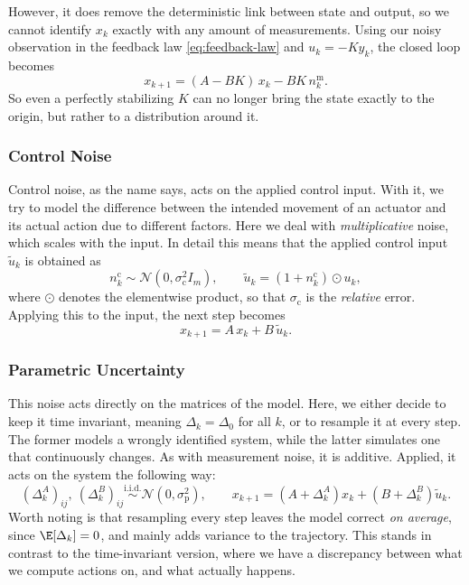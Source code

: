 However, it does remove the deterministic link between state and
output, so we cannot identify $x_k$ exactly with any amount of measurements. Using
our noisy observation in the feedback law \eqref{eq:feedback-law} and $u_k = -K y_k$, 
the closed loop becomes
\begin{equation}
    \label{eq:measurement-closed-loop}
    x_{k+1} = (A - BK)\, x_k - BK\, n^{\mathrm{m}}_k .
\end{equation}
So even a perfectly stabilizing $K$ can no longer bring the state exactly to the origin, 
but rather to a distribution around it.

\subsubsection{Control Noise}
\label{subsubsec:control-noise}

Control noise, as the name says, acts on the applied control input. With it,
we try to model the difference between the intended movement of an actuator
and its actual action due to different factors. Here we deal with
\emph{multiplicative} noise, which scales with the input. In
detail this means that the applied control input $\tilde{u}_k$ is obtained as
\begin{equation}
    \label{eq:control-noise}
    n^{\mathrm{c}}_k \sim \mathcal{N}\!\left(0, \sigma_{\mathrm{c}}^{2} I_m\right),
    \qquad
    \tilde{u}_k = \left( 1 + n^{\mathrm{c}}_k \right) \odot u_k ,
\end{equation}
where $\odot$ denotes the elementwise product, so that $\sigma_{\mathrm{c}}$ is
the \emph{relative} error. Applying this to the input, the next step becomes
\begin{equation}
    \label{eq:control-noise-step}
    x_{k+1} = A\, x_k + B\, \tilde{u}_k .
\end{equation}
\subsubsection{Parametric Uncertainty}
\label{subsubsec:parametric-uncertainty}

This noise acts directly on the matrices of the model. Here, we either decide to keep
it time invariant, meaning $\Delta_k = \Delta_0$ for all $k$, or to resample it
at every step. The former models a wrongly identified system, while the latter
simulates one that continuously changes. As with measurement noise, it is additive. 
Applied, it acts on the system the
following way:
\begin{equation}
    \label{eq:parametric-noise}
    \left( \Delta_k^{A} \right)_{ij},\ \left( \Delta_k^{B} \right)_{ij}
    \overset{\text{i.i.d.}}{\sim} \mathcal{N}\!\left(0, \sigma_{\mathrm{p}}^{2}\right),
    \qquad
    x_{k+1} = \left( A + \Delta_k^{A} \right) x_k + \left( B + \Delta_k^{B} \right) \tilde{u}_k .
\end{equation}
Worth noting is that resampling every
step leaves the model correct \emph{on average}, since
$\E[\Delta_k] = 0$, and mainly adds variance to the trajectory. This stands
in contrast to the time-invariant version, where we have a discrepancy between
what we compute actions on, and what actually happens.

